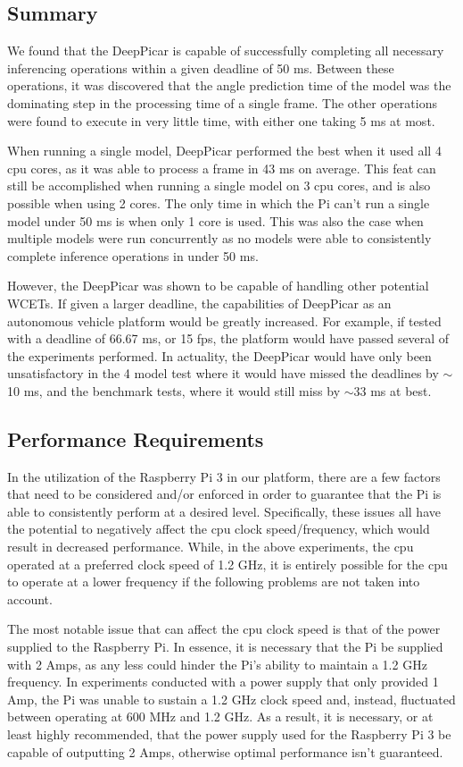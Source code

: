 \subsection{Summary}
We found that the DeepPicar is capable of successfully completing all necessary inferencing 
operations within a given deadline of 50 ms. Between these operations, it was discovered that the 
angle prediction time of the model was the dominating step in the processing time of a single frame. 
The other operations were found to execute in very little time, with either one taking 5 ms at most.

When running a single model, DeepPicar performed the best when it used all 4 cpu cores, as it was 
able to process a frame in 43 ms on average. This feat can still be accomplished when running a 
single model on 3 cpu cores, and is also possible when using 2 cores. The only time in which the Pi 
can't run a single model under 50 ms is when only 1 core is used. This was also the case when 
multiple models were run concurrently as no models were able to consistently complete inference 
operations in under 50 ms.

However, the DeepPicar was shown to be capable of handling other potential WCETs. If given a larger 
deadline, the capabilities of DeepPicar as an autonomous vehicle platform would be greatly increased. 
For example, if tested with a deadline of 66.67 ms, or 15 fps, the platform would have passed several 
of the experiments performed. In actuality, the DeepPicar would have only been unsatisfactory in the 
4 model test where it would have missed the deadlines by $\sim$10 ms, and the benchmark tests, where 
it would still miss by $\sim$33 ms at best.

\subsection{Performance Requirements}
In the utilization of the Raspberry Pi 3 in our platform, there are a few factors that need to be 
considered and/or enforced in order to guarantee that the Pi is able to consistently perform at a 
desired level. Specifically, these issues all have the potential to negatively affect the cpu clock 
speed/frequency, which would result in decreased performance. While, in the above experiments, the cpu 
operated at a preferred clock speed of 1.2 GHz, it is entirely possible for the cpu to operate at a 
lower frequency if the following problems are not taken into account.

The most notable issue that can affect the cpu clock speed is that of the power supplied to the 
Raspberry Pi. In essence, it is necessary that the Pi be supplied with 2 Amps, as any less could 
hinder the Pi's ability to maintain a 1.2 GHz frequency. In experiments conducted with a power supply that 
only provided 1 Amp, the Pi was unable to sustain a 1.2 GHz clock speed and, instead, fluctuated 
between operating at 600 MHz and 1.2 GHz. As a result, it is necessary, or at least highly 
recommended, that the power supply used for the Raspberry Pi 3 be capable of outputting 2 Amps, 
otherwise optimal performance isn't guaranteed.

